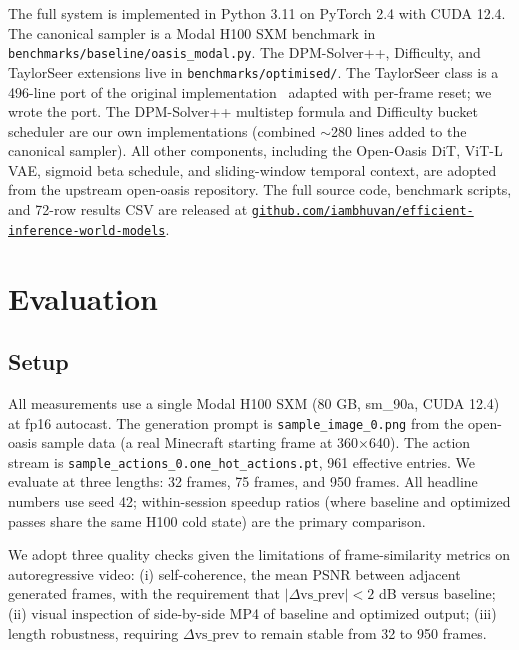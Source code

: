 \documentclass[10pt,letterpaper,twocolumn]{article}
\begin{document}
The full system is implemented in Python 3.11 on PyTorch 2.4 with CUDA 12.4. The canonical sampler is a Modal H100 SXM benchmark in \texttt{benchmarks/baseline/oasis\_modal.py}. The DPM-Solver++, Difficulty, and TaylorSeer extensions live in \texttt{benchmarks/optimised/}. The TaylorSeer class is a 496-line port of the original implementation~\citep{zhang2025taylorseer} adapted with per-frame reset; we wrote the port. The DPM-Solver++ multistep formula and Difficulty bucket scheduler are our own implementations (combined $\sim$280 lines added to the canonical sampler). All other components, including the Open-Oasis DiT, ViT-L VAE, sigmoid beta schedule, and sliding-window temporal context, are adopted from the upstream open-oasis repository. The full source code, benchmark scripts, and 72-row results CSV are released at \href{https://github.com/iambhuvan/efficient-inference-world-models}{\texttt{github.com/iambhuvan/efficient-inference-world-models}}.

\section{Evaluation}
\label{sec:eval}

\subsection{Setup}

All measurements use a single Modal H100 SXM (80 GB, sm\_90a, CUDA 12.4) at fp16 autocast. The generation prompt is \texttt{sample\_image\_0.png} from the open-oasis sample data (a real Minecraft starting frame at 360$\times$640). The action stream is \texttt{sample\_actions\_0.one\_hot\_actions.pt}, 961 effective entries. We evaluate at three lengths: 32 frames, 75 frames, and 950 frames. All headline numbers use seed 42; within-session speedup ratios (where baseline and optimized passes share the same H100 cold state) are the primary comparison.

We adopt three quality checks given the limitations of frame-similarity metrics on autoregressive video: (i) self-coherence, the mean PSNR between adjacent generated frames, with the requirement that $|\Delta \text{vs\_prev}|<2$ dB versus baseline; (ii) visual inspection of side-by-side MP4 of baseline and optimized output; (iii) length robustness, requiring $\Delta \text{vs\_prev}$ to remain stable from 32 to 950 frames.
\end{document}
